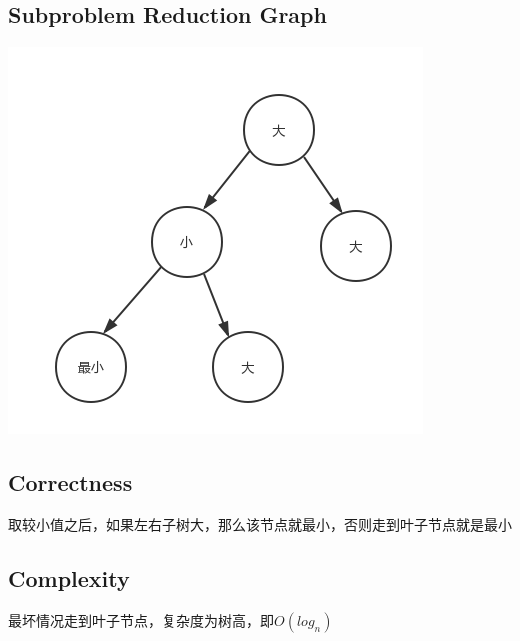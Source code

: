 \documentclass{article}
\begin{document}
\subsection{Subproblem Reduction Graph}
  \centerline{\includegraphics[scale=0.6]{q3.png}}
\subsection{Correctness}
取较小值之后，如果左右子树大，那么该节点就最小，否则走到叶子节点就是最小
\subsection{Complexity}
最坏情况走到叶子节点，复杂度为树高，即$O(log_n)$
\end{document}
